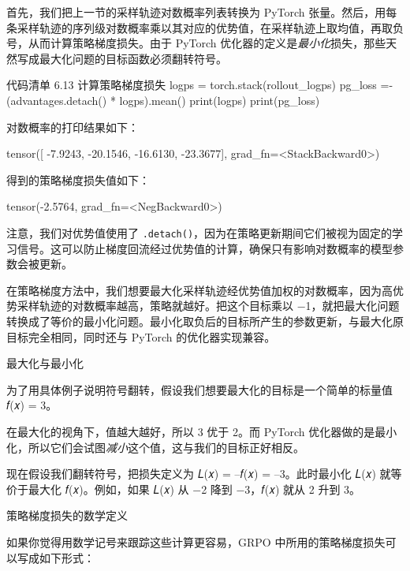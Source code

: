 
首先，我们把上一节的采样轨迹对数概率列表转换为 PyTorch 张量。然后，用每条采样轨迹的序列级对数概率乘以其对应的优势值，在采样轨迹上取均值，再取负号，从而计算策略梯度损失。由于 PyTorch 优化器的定义是\emph{最小化}损失，那些天然写成最大化问题的目标函数必须翻转符号。

\begin{codeboxt}{代码清单 6.13 计算策略梯度损失}
logps = torch.stack(rollout_logps)
pg_loss =-(advantages.detach() * logps).mean()
print(logps)
print(pg_loss)
\end{codeboxt}

对数概率的打印结果如下：

\begin{codebox}
tensor([
-7.9243, -20.1546, -16.6130, -23.3677],
grad_fn=<StackBackward0>)
\end{codebox}

得到的策略梯度损失值如下：

\begin{codebox}
tensor(-2.5764, grad_fn=<NegBackward0>)
\end{codebox}

注意，我们对优势值使用了 \texttt{.detach()}，因为在策略更新期间它们被视为固定的学习信号。这可以防止梯度回流经过优势值的计算，确保只有影响对数概率的模型参数会被更新。

在策略梯度方法中，我们想要最大化采样轨迹经优势值加权的对数概率，因为高优势采样轨迹的对数概率越高，策略就越好。把这个目标乘以 −1，就把最大化问题转换成了等价的最小化问题。最小化取负后的目标所产生的参数更新，与最大化原目标完全相同，同时还与 PyTorch 的优化器实现兼容。

\begin{mySidebar}{最大化与最小化}

为了用具体例子说明符号翻转，假设我们想要最大化的目标是一个简单的标量值 𝑓(𝑥) = 3。

在最大化的视角下，值越大越好，所以 3 优于 2。而 PyTorch 优化器做的是最小化，所以它们会试图\emph{减小}这个值，这与我们的目标正好相反。

现在假设我们翻转符号，把损失定义为 𝐿(𝑥) = –𝑓(𝑥) = –3。此时最小化 𝐿(𝑥) 就等价于最大化 𝑓(𝑥)。例如，如果 𝐿(𝑥) 从 −2 降到 −3，𝑓(𝑥) 就从 2 升到 3。

\end{mySidebar}

\begin{mySidebar}{策略梯度损失的数学定义}

如果你觉得用数学记号来跟踪这些计算更容易，GRPO 中所用的策略梯度损失可以写成如下形式：

\end{mySidebar}

